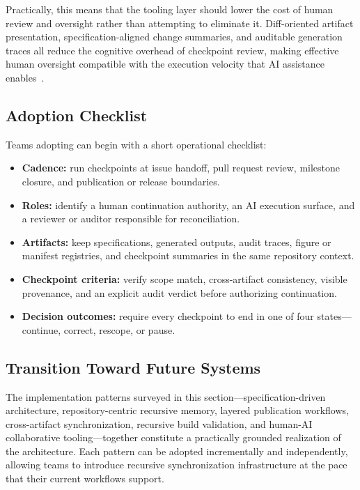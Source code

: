 Practically, this means that the tooling layer should lower the cost of human review and oversight rather than attempting to eliminate it. Diff-oriented artifact presentation, specification-aligned change summaries, and auditable generation traces all reduce the cognitive overhead of checkpoint review, making effective human oversight compatible with the execution velocity that AI assistance enables~\cite{Simon1957ModelsMan}.

\subsection{Adoption Checklist}

Teams adopting  can begin with a short operational checklist:
\begin{itemize}
  \item \textbf{Cadence:} run checkpoints at issue handoff, pull request review, milestone closure, and publication or release boundaries.
  \item \textbf{Roles:} identify a human continuation authority, an AI execution surface, and a reviewer or auditor responsible for reconciliation.
  \item \textbf{Artifacts:} keep specifications, generated outputs, audit traces, figure or manifest registries, and checkpoint summaries in the same repository context.
  \item \textbf{Checkpoint criteria:} verify scope match, cross-artifact consistency, visible provenance, and an explicit audit verdict before authorizing continuation.
  \item \textbf{Decision outcomes:} require every checkpoint to end in one of four states---continue, correct, rescope, or pause.
\end{itemize}

\subsection{Transition Toward Future Systems}

The implementation patterns surveyed in this section---specification-driven architecture, repository-centric recursive memory, layered publication workflows, cross-artifact synchronization, recursive build validation, and human-AI collaborative tooling---together constitute a practically grounded realization of the  architecture. Each pattern can be adopted incrementally and independently, allowing teams to introduce recursive synchronization infrastructure at the pace that their current workflows support.

